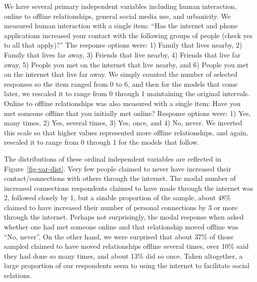 \documentclass[]{interact}
\theoremstyle{plain}%
\theoremstyle{definition}
\theoremstyle{remark}
\begin{document}
We have several primary independent variables including human
interaction, online to offline relationships, general social media use,
and urbanicity. We measured human interaction with a single item: ``Has
the internet and phone applications increased your contact with the
following groups of people (check yes to all that apply)?'' The response
options were: 1) Family that lives nearby, 2) Family that lives far
away, 3) Friends that live nearby, 4) Friends that live far away, 5)
People you met on the internet that live nearby, and 6) People you met
on the internet that live far away. We simply counted the number of
selected responses so the item ranged from 0 to 6, and then for the
models that come later, we rescaled it to range from 0 through 1
maintaining the original intervals. Online to offline relationships was
also measured with a single item: Have you met someone offline that you
initially met online? Response options were: 1) Yes, many times, 2) Yes,
several times, 3) Yes, once, and 4) No, never. We inverted this scale so
that higher values represented more offline relationships, and again,
rescaled it to range from 0 through 1 for the models that follow.

The distributions of these ordinal independent variables are reflected
in Figure~\ref{fig-var-dist}. Very few people claimed to never have
increased their contact/connections with others through the internet.
The modal number of increased connections respondents claimed to have
made through the internet was 2, followed closely by 1, but a sizable
proportion of the sample, about 48\% claimed to have increased their
number of personal connections by 3 or more through the internet.
Perhaps not surprisingly, the modal response when asked whether one had
met someone online and that relationship moved offline was ``No,
never''. On the other hand, we were surprised that about 37\% of those
sampled claimed to have moved relationships offline several times, over
10\% said they had done so many times, and about 13\% did so once. Taken
altogether, a large proportion of our respondents seem to using the
internet to facilitate social relations.
\end{document}
